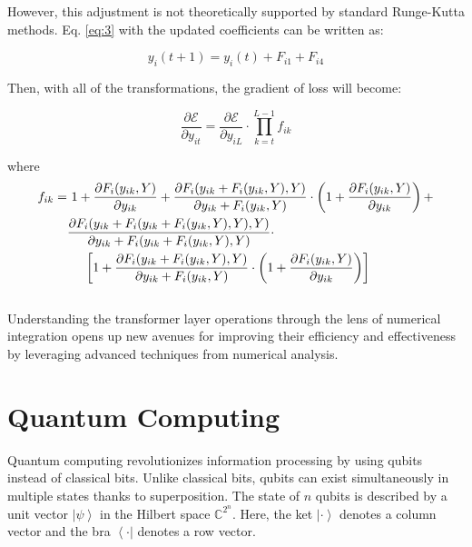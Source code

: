 \documentclass[12pt,a4paper]{report}
\begin{document}
However, this adjustment is not theoretically supported by standard Runge-Kutta methods. Eq. \ref{eq:3} with the updated coefficients can be written as:

\begin{equation}
  y_i(t + 1) = y_i(t) + F_{i1} + F_{i4}
\end{equation}

Then, with all of the transformations, the gradient of loss will become:

\begin{equation}
  \frac{\partial \mathcal{E}}{\partial y_{it}} = \frac{\partial \mathcal{E}}{\partial y_{iL}} \cdot \prod_{k=t}^{L-1} f_{ik}
\end{equation}

where
\begin{align}
  f_{ik} = & \ 1 + \frac{\partial F_i(y_{ik}, Y)}{\partial y_{ik}} + \frac{\partial F_i(y_{ik} + F_i(y_{ik}, Y), Y)}{\partial y_{ik} + F_i(y_{ik}, Y)} \cdot \left( 1 + \frac{\partial F_i(y_{ik}, Y)}{\partial y_{ik}} \right) \notag + \\
           & \frac{\partial F_i(y_{ik} + F_i(y_{ik} + F_i(y_{ik}, Y), Y), Y)}{\partial y_{ik} + F_i(y_{ik} + F_i(y_{ik}, Y), Y)} \notag  \cdot                                                                                           \\
           & \ \ \ \ \left[ 1 + \frac{\partial F_i(y_{ik} + F_i(y_{ik}, Y), Y)}{\partial y_{ik} + F_i(y_{ik}, Y)} \cdot \left( 1 + \frac{\partial F_i(y_{ik}, Y)}{\partial y_{ik}} \right)\right]
\end{align}
\\
Understanding the transformer layer operations through the lens of numerical integration opens up new avenues for improving their efficiency and effectiveness by leveraging advanced techniques from numerical analysis.

\section{Quantum Computing}
Quantum computing revolutionizes information processing by using qubits instead of classical bits. Unlike classical bits, qubits can exist simultaneously in multiple states thanks to superposition. The state of \(n\) qubits is described by a unit vector \(\left| \psi \right\rangle\) in the Hilbert space \(\mathbb{C}^{2^n}\). Here, the ket \(\left| \cdot \right\rangle\) denotes a column vector and the bra \(\left\langle \cdot \right|\) denotes a row vector.
\end{document}
